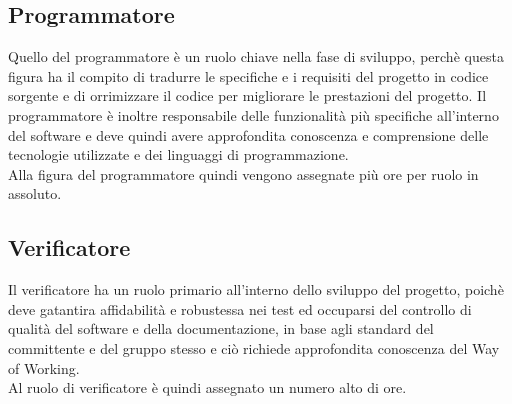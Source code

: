 \subsection{Programmatore}
Quello del programmatore è un ruolo chiave nella fase di sviluppo, perchè questa figura ha il compito di tradurre le specifiche e i requisiti del progetto in codice sorgente e di orrimizzare il codice per migliorare le prestazioni del progetto. Il programmatore è inoltre responsabile delle funzionalità più specifiche all'interno del software e deve quindi avere approfondita conoscenza e comprensione delle tecnologie utilizzate e dei linguaggi di programmazione.
\\
Alla figura del programmatore quindi vengono assegnate più ore per ruolo in assoluto. 

\subsection{Verificatore}
Il verificatore ha un ruolo primario all'interno dello sviluppo del progetto, poichè deve gatantira affidabilità e robustessa nei test ed occuparsi del controllo di qualità del software e della documentazione, in base agli standard del committente e del gruppo stesso e ciò richiede approfondita conoscenza del Way of Working. 
\\
Al ruolo di verificatore è quindi assegnato un numero alto di ore.